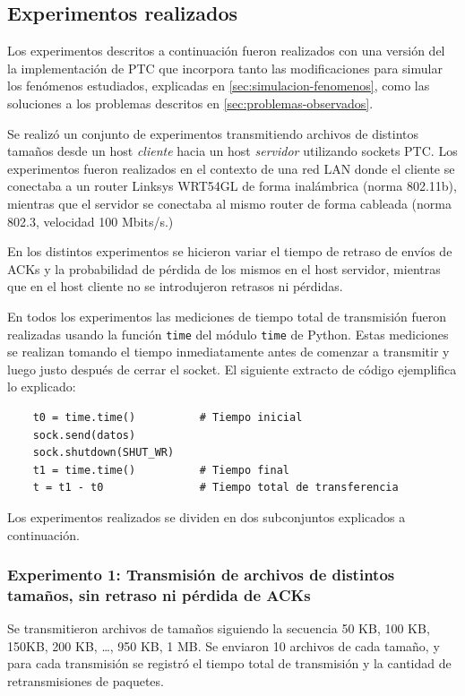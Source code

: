\documentclass[a4paper, 10pt, twoside]{article}
\begin{document}
\subsection{Experimentos realizados}
\label{sec:experimentos}

Los experimentos descritos a continuación fueron realizados con una versión del la implementación de PTC que incorpora tanto las modificaciones para simular los fenómenos estudiados, explicadas en \ref{sec:simulacion-fenomenos}, como las soluciones a los problemas descritos en \ref{sec:problemas-observados}.

Se realizó un conjunto de experimentos transmitiendo archivos de distintos tamaños desde un host \emph{cliente} hacia un host \emph{servidor} utilizando sockets PTC. Los experimentos fueron realizados en el contexto de una red LAN donde el cliente se conectaba a un router Linksys WRT54GL de forma inalámbrica (norma 802.11b), mientras que el servidor se conectaba al mismo router de forma cableada (norma 802.3, velocidad 100 Mbits/s.)

En los distintos experimentos se hicieron variar el tiempo de retraso de envíos de ACKs y la probabilidad de pérdida de los mismos en el host servidor, mientras que en el host cliente no se introdujeron retrasos ni pérdidas.

En todos los experimentos las mediciones de tiempo total de transmisión fueron realizadas usando la función \texttt{time} del módulo \texttt{time} de Python. Estas mediciones se realizan tomando el tiempo inmediatamente antes de comenzar a transmitir y luego justo después de cerrar el socket. El siguiente extracto de código ejemplifica lo explicado:

\begin{verbatim}
    t0 = time.time()          # Tiempo inicial
    sock.send(datos)
    sock.shutdown(SHUT_WR)
    t1 = time.time()          # Tiempo final
    t = t1 - t0               # Tiempo total de transferencia
\end{verbatim}

Los experimentos realizados se dividen en dos subconjuntos explicados a continuación.


\subsubsection{Experimento 1: Transmisión de archivos de distintos tamaños, sin retraso ni pérdida de ACKs}

Se transmitieron archivos de tamaños siguiendo la secuencia 50 KB, 100 KB, 150KB, 200 KB, \ldots, 950 KB, 1 MB. Se enviaron 10 archivos de cada tamaño, y para cada transmisión se registró el tiempo total de transmisión y la cantidad de retransmisiones de paquetes.
\end{document}
